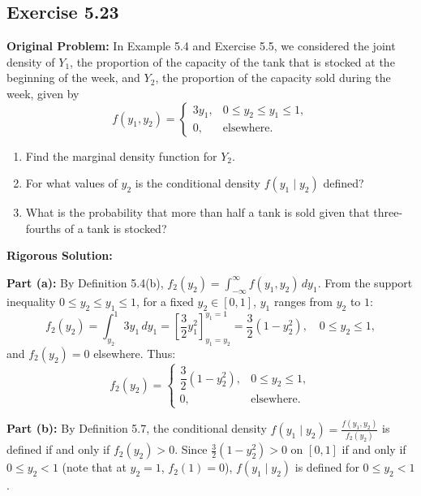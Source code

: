 \documentclass[11pt, letterpaper]{article}
\theoremstyle{definition}
\theoremstyle{remark}
\begin{document}
\subsection{Exercise 5.23}

\textbf{Original Problem:}
In Example 5.4 and Exercise 5.5, we considered the joint density of $Y_1$, the proportion of the capacity of the tank that is stocked at the beginning of the week, and $Y_2$, the proportion of the capacity sold during the week, given by
\[ f(y_1, y_2) = \begin{cases} 3y_1, & 0 \le y_2 \le y_1 \le 1, \\ 0, & \text{elsewhere.} \end{cases} \]
\begin{enumerate}[label=\textbf{\alph*}]
    \item Find the marginal density function for $Y_2$.
    \item For what values of $y_2$ is the conditional density $f(y_1 \mid y_2)$ defined?
    \item What is the probability that more than half a tank is sold given that three-fourths of a tank is stocked?
\end{enumerate}

\textbf{Rigorous Solution:}

\textbf{Part (a):} By Definition 5.4(b), $f_2(y_2) = \int_{-\infty}^\infty f(y_1, y_2) \, dy_1$. From the support inequality $0 \le y_2 \le y_1 \le 1$, for a fixed $y_2 \in [0, 1]$, $y_1$ ranges from $y_2$ to $1$:
\[ f_2(y_2) = \int_{y_2}^1 3y_1 \, dy_1 = \left[ \frac{3}{2}y_1^2 \right]_{y_1=y_2}^{y_1=1} = \frac{3}{2}(1 - y_2^2), \quad 0 \le y_2 \le 1, \]
and $f_2(y_2) = 0$ elsewhere. Thus:
\[ f_2(y_2) = \begin{cases} \dfrac{3}{2}(1 - y_2^2), & 0 \le y_2 \le 1, \\ 0, & \text{elsewhere.} \end{cases} \]

\textbf{Part (b):} By Definition 5.7, the conditional density $f(y_1 \mid y_2) = \frac{f(y_1, y_2)}{f_2(y_2)}$ is defined if and only if $f_2(y_2) > 0$. Since $\frac{3}{2}(1 - y_2^2) > 0$ on $[0, 1]$ if and only if $0 \le y_2 < 1$ (note that at $y_2 = 1$, $f_2(1) = 0$), $f(y_1 \mid y_2)$ is defined for $0 \le y_2 < 1$.
\end{document}

